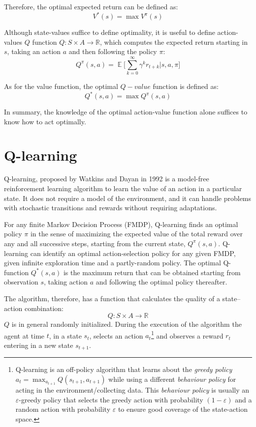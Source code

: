 \documentclass{article}
\DeclareMathOperator{\EX}{\mathbb{E}}%
\newcommand{\R}{\mathbb{R}} %
\begin{document}
Therefore, the optimal expected return can be defined as:
\begin{equation}
    V^*(s) = \max V^\pi (s)
\end{equation}

\noindent
Although state-values suffice to define optimality, it is useful to define action-values $Q$ function $Q:S \times A \rightarrow \R$, which computes the expected return starting in $s$, taking an action $a$ and then following the policy $\pi$:
\begin{equation}
    Q^\pi(s,a) = \EX \bigg[ \sum_{k=0}^{\infty} \gamma^k r_{t+k} | s,a,\pi  \bigg]
\end{equation}

As for the value function, the optimal $Q-value$ function is defined as:
\begin{equation}
    Q^*(s,a)= \max Q^\pi(s,a)
\end{equation}

In summary, the knowledge of the optimal action-value function alone suffices to know how to act optimally.


\section{Q-learning}\label{sec:ql} %
Q-learning, proposed by Watkins and Dayan  \cite{watkins1992qlearn} in 1992 is a model-free reinforcement learning algorithm to learn the value of an action in a particular state. It does not require a model of the environment, and it can handle problems with stochastic transitions and rewards without requiring adaptations.

For any finite Markov Decision Process (FMDP), Q-learning finds an optimal policy $\pi$ in the sense of maximizing the expected value of the total reward over any and all successive steps, starting from the current state, $Q^\pi(s,a)$. Q-learning can identify an optimal action-selection policy for any given FMDP, given infinite exploration time and a partly-random policy. 
The optimal Q-function $Q^*(s,a)$ is the maximum return that can be obtained starting from observation $s$, taking action $a$ and following the optimal policy thereafter. 

The algorithm, therefore, has a function that calculates the quality of a state–action combination:
\begin{equation}
    Q:S\times A \rightarrow \mathbb{R}
\end{equation}
$Q$ is in general randomly initialized. During the execution of the algorithm the agent at time $t$, in a state $s_t$, selects an action $a_t$\footnote{Q-learning is an off-policy algorithm that learns about the \textit{greedy policy} $a_t = \max_{a_{t+1}} Q(s_{t+1},a_{t+1})$ while using a different \textit{behaviour policy} for acting in the environment/collecting data. This \textit{behaviour policy} is usually an $\varepsilon$-greedy policy that selects the greedy action with probability $(1-\varepsilon)$ and a random action with probability $\varepsilon$ to ensure good coverage of the state-action space.} and observes a reward $r_t$ entering in a new state $s_{t+1}$. 
\end{document}
